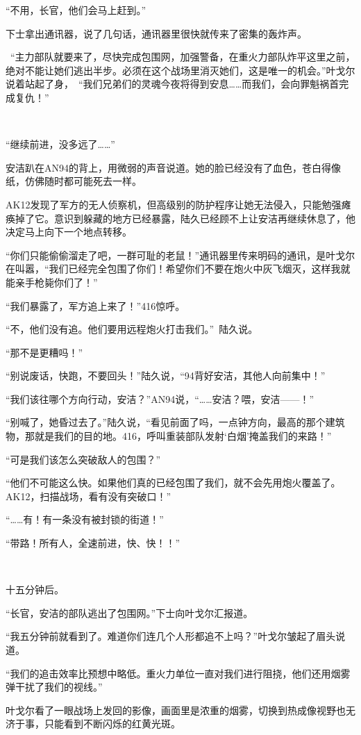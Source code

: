 “不用，长官，他们会马上赶到。”

下士拿出通讯器，说了几句话，通讯器里很快就传来了密集的轰炸声。

 “主力部队就要来了，尽快完成包围网，加强警备，在重火力部队炸平这里之前，绝对不能让她们逃出半步。必须在这个战场里消灭她们，这是唯一的机会。”叶戈尔说着站起了身， “我们兄弟们的灵魂今夜将得到安息……而我们，会向罪魁祸首完成复仇！”

 

“继续前进，没多远了……”

安洁趴在AN94的背上，用微弱的声音说道。她的脸已经没有了血色，苍白得像纸，仿佛随时都可能死去一样。

AK12发现了军方的无人侦察机，但高级别的防护程序让她无法侵入，只能勉强瘫痪掉了它。意识到躲藏的地方已经暴露，陆久已经顾不上让安洁再继续休息了，他决定马上向下一个地点转移。

“你们只能偷偷溜走了吧，一群可耻的老鼠！”通讯器里传来明码的通讯，是叶戈尔在叫嚣，“我们已经完全包围了你们！希望你们不要在炮火中灰飞烟灭，这样我就能亲手枪毙你们了！”

“我们暴露了，军方追上来了！”416惊呼。

“不，他们没有追。他们要用远程炮火打击我们。” 陆久说。

“那不是更糟吗！”

“别说废话，快跑，不要回头！”陆久说，“94背好安洁，其他人向前集中！”

“我们该往哪个方向行动，安洁？”AN94说，“……安洁？喂，安洁——！”

“别喊了，她昏过去了。”陆久说，“看见前面了吗，一点钟方向，最高的那个建筑物，那就是我们的目的地。416，呼叫重装部队发射‘白烟’掩盖我们的来路！”

“可是我们该怎么突破敌人的包围？”

“他们不可能这么快。如果他们真的已经包围了我们，就不会先用炮火覆盖了。AK12，扫描战场，看有没有突破口！”

“……有！有一条没有被封锁的街道！”

“带路！所有人，全速前进，快、快！！”

 

十五分钟后。

“长官，安洁的部队逃出了包围网。”下士向叶戈尔汇报道。

“我五分钟前就看到了。难道你们连几个人形都追不上吗？”叶戈尔皱起了眉头说道。

“我们的追击效率比预想中略低。重火力单位一直对我们进行阻挠，他们还用烟雾弹干扰了我们的视线。”

叶戈尔看了一眼战场上发回的影像，画面里是浓重的烟雾，切换到热成像视野也无济于事，只能看到不断闪烁的红黄光斑。

